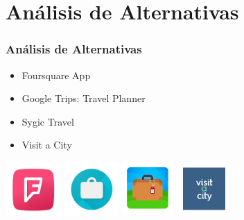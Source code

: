 \documentclass[usenames,dvipsnames]{beamer}
\begin{document}
\section{Análisis de Alternativas}
\begin{frame}
\frametitle{Análisis de Alternativas}

\begin{itemize}
 \item Foursquare App
 \item Google Trips: Travel Planner
 \item Sygic Travel
 \item Visit a City
\end{itemize}


\vspace{0.5cm}
\begin{center}
\includegraphics[height=2cm]{./img/FoursquareApp.png}
\includegraphics[height=2cm]{./img/GoogleTrips.png}
\includegraphics[height=2cm]{./img/SygicTravel.png}
\includegraphics[height=2cm]{./img/VisitaCity.png}

\end{center}
\end{frame}
\end{document}
